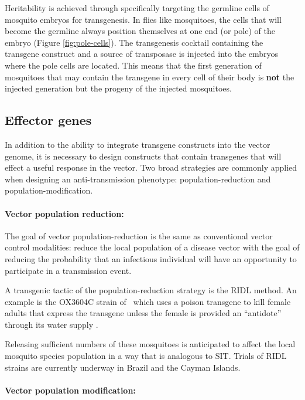 Heritability is achieved through specifically targeting the \gls{germline} cells of mosquito embryos for transgenesis.
In flies like mosquitoes, the cells that will become the germline always position themselves at one end (or pole) of the embryo (Figure \ref{fig:pole-cells}).
The transgenesis cocktail containing the transgene construct and a source of transposase is injected into the embryos where the pole cells are located.
This means that the first generation of mosquitoes that may contain the transgene in every cell of their body is \textbf{not} the injected generation but the progeny of the injected mosquitoes.



\subsection{Effector genes}

In addition to the ability to integrate transgene constructs into the vector genome, it is necessary to design constructs that contain transgenes that will effect a useful response in the vector.
Two broad strategies are commonly applied when designing an anti-transmission phenotype: \gls{population-reduction} and \gls{population-modification}.

\paragraph*{Vector population reduction:}

The goal of vector \gls{population-reduction} is the same as conventional vector control modalities: reduce the local population of a disease vector with the goal of reducing the probability that an infectious individual will have an opportunity to participate in a transmission event.


A transgenic tactic of the \gls{population-reduction} strategy is the \gls{RIDL} method.
An example is the OX3604C strain of \Aa\ which uses a poison transgene to kill female adults that express the transgene unless the female is provided an ``antidote'' through its water supply \cite{WisedeValdez2011,Bargielowski2012,Facchinelli2013}.

Releasing sufficient numbers of these mosquitoes is anticipated to affect the local mosquito species population in a way that is analogous to \gls{SIT}.
Trials of \gls{RIDL} strains are currently underway in Brazil and the Cayman Islands.

\paragraph*{Vector population modification:}

